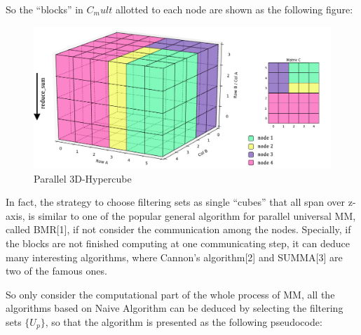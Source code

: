 \documentclass{amsart}
\theoremstyle{definition}
\theoremstyle{remark}
\numberwithin{equation}{section}
\begin{document}
\par
So the “blocks” in ${C_mult}$ allotted to each node are shown as the following figure:\\
\begin{figure}[h]
	\includegraphics[scale=0.35]{Figures/Matrix3d_Filter.png}
	\caption{Parallel 3D-Hypercube}
\end{figure}
\par
	In fact, the strategy to choose filtering sets as single “cubes” that all span over z-axis, is similar to one of the popular general algorithm for parallel universal MM, called BMR[1], if not consider the communication among the nodes. Specially, if the blocks are not finished computing at one communicating step, it can deduce many interesting algorithms, where Cannon’s algorithm[2] and SUMMA[3] are two of the famous ones.\par
	So only consider the computational part of the whole process of MM, all the algorithms based on Naive Algorithm can be deduced by selecting the filtering sets $\{U_p\}$, so that the algorithm is presented as the following pseudocode:\par
\end{document}
